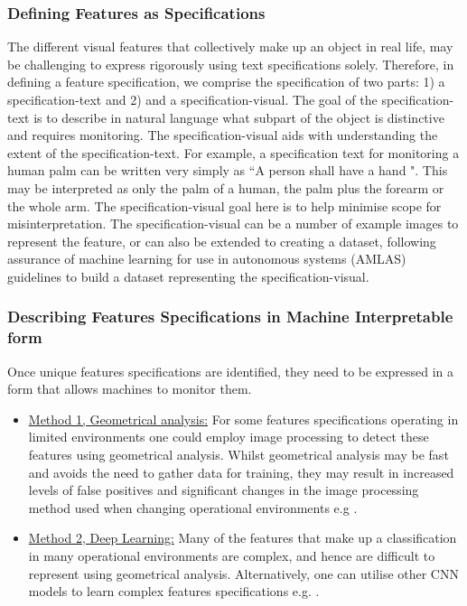 \subsubsection{Defining Features as Specifications}
The different visual features that collectively make up an object in real life, may be challenging to express rigorously using text specifications solely. Therefore, in defining a feature specification, we comprise the specification of two parts: 1) a specification-text and 2) and a specification-visual. 
%
The goal of the specification-text is to describe in natural language what subpart of the object is distinctive and requires monitoring. The specification-visual aids with understanding the extent of the specification-text. 
%
For example, a specification text for monitoring a human palm can be written very simply as ``A person shall have a hand ". This may be interpreted as only the palm of a human, the palm plus the forearm or the whole arm. The specification-visual goal here is to help minimise scope for misinterpretation. 
%
The specification-visual can be a number of example images to represent the feature, or can also be extended to creating a dataset, following assurance of machine learning for use in autonomous systems (AMLAS) guidelines \cite{hawkins2021guidance} to build a dataset representing the specification-visual.
\subsubsection{Describing Features Specifications in Machine Interpretable form}

Once unique features specifications are identified, they need to be expressed in a form that allows machines to  monitor them.
\begin{itemize}
\item \underline{Method 1, Geometrical analysis:} For some features specifications operating in limited environments one could employ image processing to detect these features using geometrical analysis. 
%
Whilst geometrical analysis may be fast and avoids the need to gather data for training, they may result in increased levels of false positives and significant changes in the image processing method used when changing operational environments e.g \cite{Lucian2018}. 

\item \underline{Method 2, Deep Learning:} Many of the features that make up a classification in many operational environments are complex, and hence are difficult to represent using geometrical analysis.
%
Alternatively, one can utilise other CNN models to learn complex features specifications e.g. \cite{Kazemi2014}\cite{Fahn2017}. 

\end{itemize}

